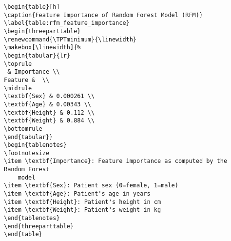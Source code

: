 \documentclass[11pt]{article}
\begin{document}
\begin{Verbatim}[tabsize=4]
\begin{table}[h]
\caption{Feature Importance of Random Forest Model (RFM)}
\label{table:rfm_feature_importance}
\begin{threeparttable}
\renewcommand{\TPTminimum}{\linewidth}
\makebox[\linewidth]{%
\begin{tabular}{lr}
\toprule
 & Importance \\
Feature &  \\
\midrule
\textbf{Sex} & 0.000261 \\
\textbf{Age} & 0.00343 \\
\textbf{Height} & 0.112 \\
\textbf{Weight} & 0.884 \\
\bottomrule
\end{tabular}}
\begin{tablenotes}
\footnotesize
\item \textbf{Importance}: Feature importance as computed by the Random Forest
	model
\item \textbf{Sex}: Patient sex (0=female, 1=male)
\item \textbf{Age}: Patient's age in years
\item \textbf{Height}: Patient's height in cm
\item \textbf{Weight}: Patient's weight in kg
\end{tablenotes}
\end{threeparttable}
\end{table}

\end{Verbatim}
\end{document}
